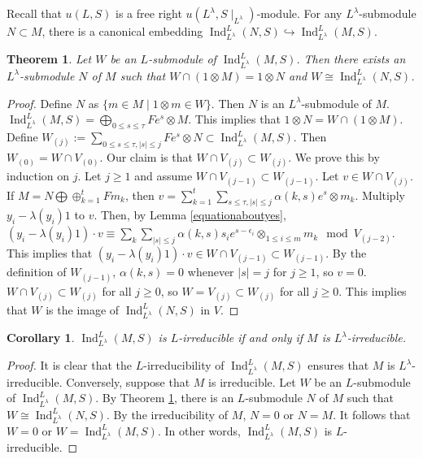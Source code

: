 \documentclass[12pt,MSc]{muthesis_2023}
\theoremstyle{plain}%
\newtheorem{Theorem}[FactCounter]{Theorem} %
\newtheorem{Corollary}[FactCounter]{Corollary} %
\theoremstyle{definition}
\theoremstyle{remark}
\DeclareMathOperator{\Ind}{Ind}
\begin{document}
Recall that $u(L,S)$ is a free right $u(L^{\lambda}, S\mid_{L^{\lambda}})$-module. For any $L^{\lambda}$-submodule $N\subset M$, there is a canonical embedding $\Ind^L_{L^{\lambda}}(N, S) \hookrightarrow \Ind^L_{L^{\lambda}}(M, S)$. 

\begin{Theorem}\label{submoduleisomorphictoinducedodule}
Let $W$ be an $L$-submodule of $\Ind^L_{L^{\lambda}}(M, S)$. Then there exists an $L^{\lambda}$-submodule $N$ of $M$ such that $W\cap(1\otimes M)=1\otimes N$ and $W\cong \Ind^L_{L^{\lambda}}(N, S)$. 

\end{Theorem}

\begin{proof}
Define $N$ as $\{m\in M \mid 1\otimes m \in W\}$. Then $N$ is an $L^{\lambda}$-submodule of $M$. $\Ind^L_{L^{\lambda}}(M, S)=\bigoplus_{0\leq s \leq \tau}Fe^s\otimes M$. This implies that $1\otimes N=W\cap (1\otimes M)$. Define $W_{(j)}:= \sum_{0\leq s\leq \tau, |s|\leq j}Fe^s\otimes N\subset \Ind^L_{L^{\lambda}}(M, S)$. Then $W_{(0)}=W\cap V_{(0)}$. Our claim is that $W\cap V_{(j)} \subset W_{(j)}$. We prove this by induction on $j$. Let $j\geq 1$ and assume $W\cap V_{(j-1)}\subset W_{(j-1)}$. Let $v\in W\cap V_{(j)}$. If $M=N\bigoplus \oplus^t_{k=1}Fm_k$, then $v=\sum^t_{k=1}\sum_{s\leq\tau, |s|\leq j}\alpha(k,s)e^s\otimes m_k$. Multiply $y_i-\lambda(y_i)1$ to $v$. Then, by Lemma \ref{equationaboutyes}, $(y_i-\lambda(y_i)1)\cdot v \equiv \sum_k\sum_{|s|\leq j}\alpha(k,s)s_ie^{s-\epsilon_i}\otimes_{1\leq i\leq m}m_k \mod V_{(j-2)}$. This implies that $(y_i-\lambda(y_i)1)\cdot v \in W\cap V_{(j-1)}\subset W_{(j-1)}$. By the definition of $W_{(j-1)}$, $\alpha(k,s)=0$ whenever $|s|=j$ for $j\geq1$, so $v=0$. $W\cap V_{(j)}\subset W_{(j)}$ for all $j\geq 0$, so $W= V_{(j)}\subset W_{(j)}$ for all $j\geq 0$. This implies that $W$ is the image of $ \Ind^L_{L^{\lambda}}(N, S)$ in $V$.
\end{proof}

\begin{Corollary}\label{indirredifforgirred}
$ \Ind^L_{L^{\lambda}}(M, S)$ is $L$-irreducible if and only if $M$ is $L^{\lambda}$-irreducible.

\end{Corollary}

\begin{proof}
It is clear that the $L$-irreducibility of $\Ind^L_{L^{\lambda}}(M, S)$ ensures that $M$ is $L^{\lambda}$-irreducible. Conversely, suppose that $M$ is irreducible. Let $W$ be an $L$-submodule of $\Ind^L_{L^{\lambda}}(M, S)$. By Theorem \ref{submoduleisomorphictoinducedodule}, there is an $L$-submodule $N$ of $M$ such that $W\cong \Ind^L_{L^{\lambda}}(N, S)$. By the irreducibility of $M$, $N=0$ or $N=M$. It follows that $W=0$ or $W=\Ind^L_{L^{\lambda}}(M, S)$. In other words, $\Ind^L_{L^{\lambda}}(M, S)$ is $L$-irreducible.
\end{proof}
\end{document}
